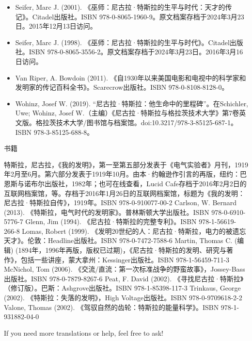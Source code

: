 \begin{itemize}
\item Seifer, Marc J. (2001). 《巫师：尼古拉·特斯拉的生平与时代：天才的传记》。Citadel出版社。ISBN 978-0-8065-1960-9。原文档案存档于2024年3月23日。2015年12月13日访问。  
\item Seifer, Marc J. (1998). 《巫师：尼古拉·特斯拉的生平与时代》。Citadel出版社。ISBN 978-0-8065-3556-2。原文档案存档于2024年3月23日。2016年3月16日访问。  
\item Van Riper, A. Bowdoin (2011). 《自1930年以来美国电影和电视中的科学家和发明家的传记百科全书》。Scarecrow出版社。ISBN 978-0-8108-8128-0。  
\item Wohinz, Josef W. (2019). “尼古拉·特斯拉：他生命中的里程碑”。在Schichler, Uwe; Wohinz, Josef W.（主编）《尼古拉·特斯拉与格拉茨技术大学》第7卷英文版。格拉茨技术大学/图书馆与档案馆。doi:10.3217/978-3-85125-687-1。ISBN 978-3-85125-688-8。
\end{itemize}


书籍

特斯拉，尼古拉，《我的发明》，第一至第五部分发表于《电气实验者》月刊，1919年2月至6月。第六部分发表于1919年10月。由本·约翰逊作引言的再版，纽约：巴恩斯与诺布尔出版社，1982年；也可在线查看，Lucid Cafe存档于2016年2月2日的互联网档案馆，等。存档于2016年1月26日的互联网档案馆，标题为《我的发明：尼古拉·特斯拉自传》，1919年。ISBN 978-0-910077-00-2  
Carlson, W. Bernard (2013). 《特斯拉，电气时代的发明家》。普林斯顿大学出版社。ISBN 978-0-6910-5776-7  
Glenn, Jim (1994). 《尼古拉·特斯拉的完整专利》。ISBN 978-1-56619-266-8  
Lomas, Robert (1999). 《发明20世纪的人：尼古拉·特斯拉，电力的被遗忘天才》。伦敦：Headline出版社。ISBN 978-0-7472-7588-6  
Martin, Thomas C. (编辑) (1894年，1996年再版，版权已过期)，《尼古拉·特斯拉的发明、研究与著作》，包括一些讲座，蒙大拿州：Kessinger出版社。ISBN 978-1-56459-711-3  
McNichol, Tom (2006). 《交流/直流：第一次标准战争的野蛮故事》，Jossey-Bass出版社。ISBN 978-0-7879-8267-6  
Peat, F. David (2002). 《寻找尼古拉·特斯拉》（修订版）。巴斯：Ashgrove出版社。ISBN 978-1-85398-117-3  
Trinkaus, George (2002). 《特斯拉：失落的发明》，High Voltage出版社。ISBN 978-0-9709618-2-2  
Valone, Thomas (2002). 《驾驭自然的齿轮：特斯拉的能量科学》。ISBN 978-1-931882-04-0

If you need more translations or help, feel free to ask!